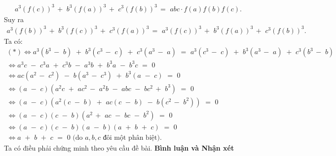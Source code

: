 \begin{multicols}{2}
	\begin{align*}
		{a^3}{\left( {f\left( c \right)} \right)^3}\, + \,\,{b^3}{\left( {f\left( a \right)} \right)^3}\, + \,\,{c^3}{\left( {f\left( b \right)} \right)^3}\, = \,\,abc \cdot f\left( a \right)f\left( b \right)f\left( c \right).
	\end{align*}
	Suy ra
	\begin{align*}
		{a^3}{\left( {f\left( b \right)} \right)^3}\, + \,\,{b^3}{\left( {f\left( c \right)} \right)^3}\, + \,\,{c^3}{\left( {f\left( a \right)} \right)^3}\, = \,\,{a^3}{\left( {f\left( c \right)} \right)^3}\, + \,\,{b^3}{\left( {f\left( a \right)} \right)^3}\, + \,\,{c^3}{\left( {f\left( b \right)} \right)^3}.
	\end{align*}
	Ta có:
	\begin{align*}
		(*) \Leftrightarrow {a^3}\left( {{b^3}\, - \,\,b} \right)\,\, + \,\,{b^3}\left( {{c^3}\, - \,\,c} \right)\,\, + \,\,{c^3}\left( {{a^3}\, - \,\,a} \right)\,\, = \,\,{a^3}\left( {{c^3}\, - \,\,c} \right)\,\, + \,\,{b^3}\left( {{a^3}\, - \,\,a} \right)\,\, + \,\,{c^3}\left( {{b^3}\, - \,\,b} \right)\\
		\Leftrightarrow {a^3}c\,\, - \,\,{c^3}a\,\, + \,\,{c^3}b\,\, - \,\,{a^3}b\,\, + \,\,{b^3}a\,\, - \,\,{b^3}c\,\, = \,\,0\\
		\Leftrightarrow ac\left( {{a^2}\, - \,\,{c^2}} \right)\,\, - \,\,b\left( {{a^3}\, - \,\,{c^3}} \right)\,\, + \,\,{b^3}\left( {a\,\, - \,\,c} \right)\,\, = \,\,0\\
		\Leftrightarrow \left( {a\,\, - \,\,c} \right)\left( {{a^2}c\,\, + \,\,a{c^2}\, - \,\,{a^2}b\,\, - \,\,abc\,\, - \,\,b{c^2}\, + \,\,{b^3}} \right)\,\, = \,\,0\\
		\Leftrightarrow \left( {a\,\, - \,\,c} \right)\left( {{a^2}\left( {c\,\, - \,\,b} \right)\,\, + \,\,ac\left( {c\,\, - \,\,b} \right)\,\, - \,\,b\left( {{c^2}\, - \,\,{b^2}} \right)} \right)\,\, = \,\,0\\
		\Leftrightarrow \left( {a\,\, - \,\,c} \right)\left( {c\,\, - \,\,b} \right)\left( {{a^2}\, + \,\,ac\,\, - \,\,bc\,\, - \,\,{b^2}} \right)\,\, = \,\,0\\
		\Leftrightarrow \left( {a\,\, - \,\,c} \right)\left( {c\,\, - \,\,b} \right)\left( {a\,\, - \,\,b} \right)\left( {a\,\, + \,\,b\,\, + \,\,c} \right)\,\, = \,\,0\\
		\Leftrightarrow a\,\, + \,\,b\,\, + \,\,c\,\, = \,\,0 \text{ (do $a,b,c$ đôi một phân biệt).}
	\end{align*}
	Ta có điều phải chứng minh theo yêu cầu đề bài.
	\vskip 0.05cm
	\textbf{Bình luận và Nhận xét}

\end{multicols}
